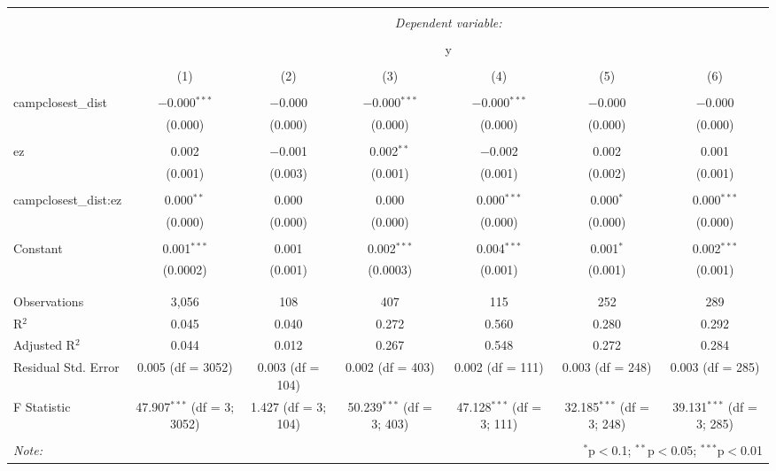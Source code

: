 
\begin{table}[!htbp] \centering 
  \caption{} 
  \label{} 
\begin{tabular}{@{\extracolsep{5pt}}lcccccc} 
\\[-1.8ex]\hline 
\hline \\[-1.8ex] 
 & \multicolumn{6}{c}{\textit{Dependent variable:}} \\ 
\cline{2-7} 
\\[-1.8ex] & \multicolumn{6}{c}{y} \\ 
\\[-1.8ex] & (1) & (2) & (3) & (4) & (5) & (6)\\ 
\hline \\[-1.8ex] 
 campclosest\_dist & $-$0.000$^{***}$ & $-$0.000 & $-$0.000$^{***}$ & $-$0.000$^{***}$ & $-$0.000 & $-$0.000 \\ 
  & (0.000) & (0.000) & (0.000) & (0.000) & (0.000) & (0.000) \\ 
  & & & & & & \\ 
 ez & 0.002 & $-$0.001 & 0.002$^{**}$ & $-$0.002 & 0.002 & 0.001 \\ 
  & (0.001) & (0.003) & (0.001) & (0.001) & (0.002) & (0.001) \\ 
  & & & & & & \\ 
 campclosest\_dist:ez & 0.000$^{**}$ & 0.000 & 0.000 & 0.000$^{***}$ & 0.000$^{*}$ & 0.000$^{***}$ \\ 
  & (0.000) & (0.000) & (0.000) & (0.000) & (0.000) & (0.000) \\ 
  & & & & & & \\ 
 Constant & 0.001$^{***}$ & 0.001 & 0.002$^{***}$ & 0.004$^{***}$ & 0.001$^{*}$ & 0.002$^{***}$ \\ 
  & (0.0002) & (0.001) & (0.0003) & (0.001) & (0.001) & (0.001) \\ 
  & & & & & & \\ 
\hline \\[-1.8ex] 
Observations & 3,056 & 108 & 407 & 115 & 252 & 289 \\ 
R$^{2}$ & 0.045 & 0.040 & 0.272 & 0.560 & 0.280 & 0.292 \\ 
Adjusted R$^{2}$ & 0.044 & 0.012 & 0.267 & 0.548 & 0.272 & 0.284 \\ 
Residual Std. Error & 0.005 (df = 3052) & 0.003 (df = 104) & 0.002 (df = 403) & 0.002 (df = 111) & 0.003 (df = 248) & 0.003 (df = 285) \\ 
F Statistic & 47.907$^{***}$ (df = 3; 3052) & 1.427 (df = 3; 104) & 50.239$^{***}$ (df = 3; 403) & 47.128$^{***}$ (df = 3; 111) & 32.185$^{***}$ (df = 3; 248) & 39.131$^{***}$ (df = 3; 285) \\ 
\hline 
\hline \\[-1.8ex] 
\textit{Note:}  & \multicolumn{6}{r}{$^{*}$p$<$0.1; $^{**}$p$<$0.05; $^{***}$p$<$0.01} \\ 
\end{tabular} 
\end{table} 
